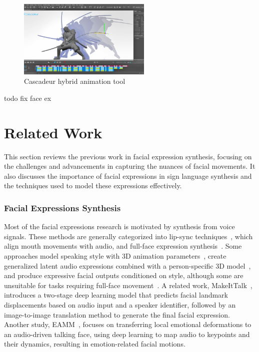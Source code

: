 \documentclass[../../main.tex]{subfiles}
\begin{document}
\begin{figure} 
  \centering \includegraphics[width = 2.5in]{chapters/background_work/images/cascadeur.png} 
  \caption{Cascadeur hybrid animation tool} 
  \label{fig:cascadeur} 
\end{figure}

todo fix face ex

\section{Related Work}
\label{ch:facial_expressions:related_work}

This section reviews the previous work in facial expression synthesis, focusing on the challenges and advancements in capturing the nuances of facial movements. It also discusses the importance of facial expressions in sign language synthesis and the techniques used to model these expressions effectively.

\subsubsection{Facial Expressions Synthesis}
\label{ch:facial_expressions:related_work:facial_expressions_synthesis}

Most of the facial expressions research is motivated by synthesis from voice signals. These methods are generally categorized into lip-sync techniques~\cite{yousaidthat, talkingface, lipmovements, lipsyncexpert}, which align mouth movements with audio, and full-face expression synthesis~\cite{eskimez, greenwood18, controllable_facial_synth}. Some approaches model speaking style with 3D animation parameters~\cite{cudeiro}, create generalized latent audio expressions combined with a person-specific 3D model~\cite{FLAME}, and produce expressive facial outputs conditioned on style, although some are unsuitable for tasks requiring full-face movement~\cite{imitating}. A related work, MakeItTalk~\cite{Yang:2020:MakeItTalk}, introduces a two-stage deep learning model that predicts facial landmark displacements based on audio input and a speaker identifier, followed by an image-to-image translation method to generate the final facial expression. Another study, EAMM~\cite{eamm}, focuses on transferring local emotional deformations to an audio-driven talking face, using deep learning to map audio to keypoints and their dynamics, resulting in emotion-related facial motions.
\end{document}
